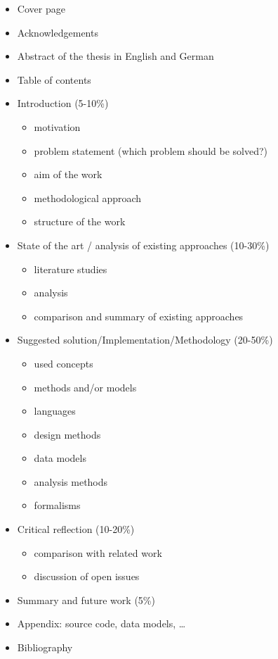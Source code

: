 \begin{itemize}
  \item	Cover page
  \item Acknowledgements
  \item Abstract of the thesis in English and German
  \item Table of contents
  \item Introduction (5-10\%)
  	\begin{itemize}
  		\item motivation
  		\item problem statement (which problem should be solved?)
  		\item aim of the work
  		\item methodological approach
  		\item structure of the work
  	\end{itemize}
  \item State of the art / analysis of existing approaches (10-30\%)
  	\begin{itemize}
  		\item literature studies
  		\item analysis
  		\item comparison and summary of existing approaches
  	\end{itemize}
  \item Suggested solution/Implementation/Methodology (20-50\%)
  	\begin{itemize}
  		\item used concepts
  		\item methods and/or models
  		\item languages
  		\item design methods
  		\item data models
  		\item analysis methods
  		\item formalisms
  	\end{itemize}
  \item Critical reflection (10-20\%)
  	\begin{itemize}
  		\item comparison with related work
  		\item discussion of open issues
  	\end{itemize}
  \item Summary and future work (5\%)
  \item Appendix: source code, data models, \dots
  \item Bibliography
\end{itemize}


